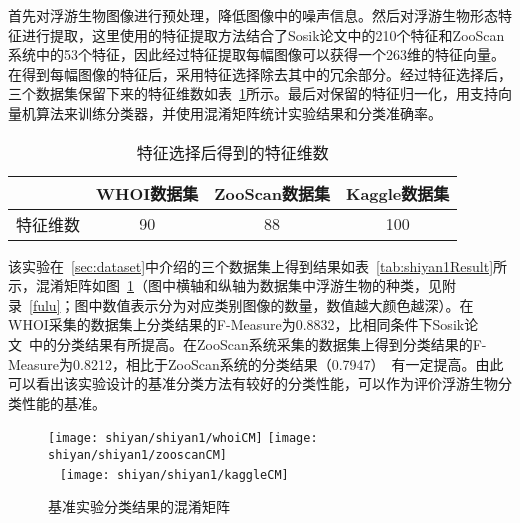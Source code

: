 首先对浮游生物图像进行预处理，降低图像中的噪声信息。然后对浮游生物形态特征进行提取，这里使用的特征提取方法结合了Sosik论文中的210个特征和ZooScan系统中的53个特征，因此经过特征提取每幅图像可以获得一个263维的特征向量。在得到每幅图像的特征后，采用特征选择除去其中的冗余部分。经过特征选择后，三个数据集保留下来的特征维数如表~\ref{tab:weishu}所示。最后对保留的特征归一化，用支持向量机算法来训练分类器，并使用混淆矩阵统计实验结果和分类准确率。

\begin{table}[htbp]
\small
  \centering
  \caption{特征选择后得到的特征维数}
  \label{tab:weishu}
  \begin{tabular}[c]{cccc}
    \toprule
    ~ & WHOI数据集 & ZooScan数据集 & Kaggle数据集\\
    \midrule
    特征维数 & 90 & 88 & 100\\
    \bottomrule
  \end{tabular}
\end{table}

该实验在~\ref{sec:dataset}中介绍的三个数据集上得到结果如表~\ref{tab:shiyan1Result}所示，混淆矩阵如图~\ref{fig:shiyan1}（图中横轴和纵轴为数据集中浮游生物的种类，见附录~\ref{fulu}；图中数值表示分为对应类别图像的数量，数值越大颜色越深）。在WHOI采集的数据集上分类结果的F-Measure为0.8832，比相同条件下Sosik论文~\cite{sosik2007automated}中的分类结果有所提高。在ZooScan系统采集的数据集上得到分类结果的F-Measure为0.8212，相比于ZooScan系统的分类结果（0.7947）~\cite{gorsky2010digital}有一定提高。由此可以看出该实验设计的基准分类方法有较好的分类性能，可以作为评价浮游生物分类性能的基准。

\begin{figure}[h]
  \centering%
    {\texttt{[image: shiyan/shiyan1/whoiCM]}}%
      {\texttt{[image: shiyan/shiyan1/zooscanCM]}}\\
  ~\newline
      {\texttt{[image: shiyan/shiyan1/kaggleCM]}}
  \caption{基准实验分类结果的混淆矩阵}
  \label{fig:shiyan1}
\end{figure}

